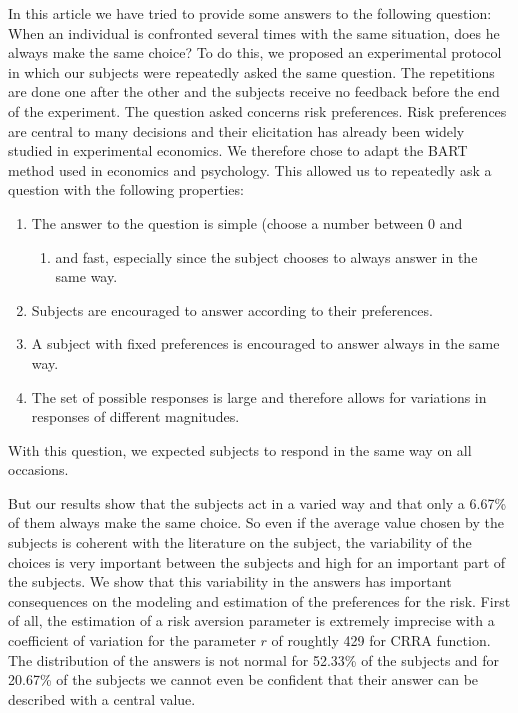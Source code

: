 \documentclass[
]{book}
\providecommand{\tightlist}{%
  \setlength{\itemsep}{0pt}\setlength{\parskip}{0pt}}
\begin{document}
In this article we have tried to provide some answers to the following
question: When an individual is confronted several times with the same
situation, does he always make the same choice? To do this, we proposed
an experimental protocol in which our subjects were repeatedly asked the
same question. The repetitions are done one after the other and the
subjects receive no feedback before the end of the experiment. The question
asked concerns risk preferences. Risk preferences are central to many
decisions and their elicitation has already been widely studied in
experimental economics. We therefore chose to adapt the BART method used
in economics and psychology. This allowed us to repeatedly ask a
question with the following properties:

\begin{enumerate}
\def\labelenumi{\arabic{enumi}.}
\tightlist
\item
  The answer to the question is simple (choose a number between 0 and

  \begin{enumerate}
  \def\labelenumii{\arabic{enumii})}
  \setcounter{enumii}{63}
  \tightlist
  \item
    and fast, especially since the subject chooses to always answer
    in the same way.
  \end{enumerate}
\item
  Subjects are encouraged to answer according to their preferences.
\item
  A subject with fixed preferences is encouraged to answer always in
  the same way.
\item
  The set of possible responses is large and therefore allows for
  variations in responses of different magnitudes.
\end{enumerate}

With this question, we expected subjects to respond in the same way on all
occasions.

But our results show that the subjects act in a varied way and that only
a 6.67\% of them always make
the same choice. So even if the average value chosen by the subjects is
coherent with the literature on the subject, the variability of the
choices is very important between the subjects and high for an important
part of the subjects. We show that this variability in the answers has
important consequences on the modeling and estimation of the preferences
for the risk. First of all, the estimation of a risk aversion parameter
is extremely imprecise with a coefficient of variation for the parameter \(r\) of
roughtly 429 for CRRA function.
The distribution of the answers is not normal for
52.33\% of the subjects
and for 20.67\% of the
subjects we cannot even be confident that their answer can be
described with a central value.
\end{document}
